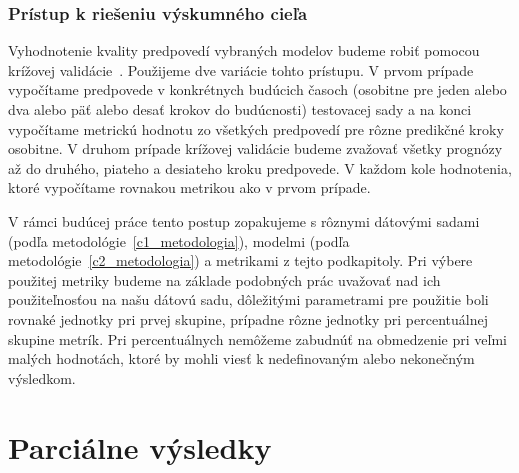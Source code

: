 \documentclass[thesismargins, thesislinespacing, openright, upjsfrontpage, combineabstracts]{rnthesis}
\begin{document}
\subsection{Prístup k riešeniu výskumného cieľa}
 
Vyhodnotenie kvality predpovedí vybraných modelov budeme robiť pomocou krížovej validácie~\cite{hyndman2018forecasting}. Použijeme dve variácie tohto prístupu. V prvom prípade vypočítame predpovede v konkrétnych budúcich časoch (osobitne pre jeden alebo dva alebo päť alebo desať krokov do budúcnosti) testovacej sady a na konci vypočítame metrickú hodnotu zo všetkých predpovedí pre rôzne predikčné kroky osobitne.  V druhom prípade krížovej validácie budeme zvažovať všetky prognózy až do druhého, piateho a desiateho kroku predpovede. V každom kole hodnotenia, ktoré vypočítame rovnakou metrikou ako v prvom prípade.

V rámci budúcej práce tento postup zopakujeme s rôznymi dátovými sadami (podľa metodológie~\ref{c1_metodologia}), modelmi (podľa metodológie~\ref{c2_metodologia}) a metrikami z tejto podkapitoly. Pri výbere použitej metriky budeme na základe podobných prác uvažovať nad ich použiteľnosťou na našu dátovú sadu, dôležitými parametrami pre použitie boli rovnaké jednotky pri prvej skupine, prípadne rôzne jednotky pri percentuálnej skupine metrík. Pri percentuálnych nemôžeme zabudnúť na obmedzenie pri veľmi malých hodnotách, ktoré by mohli viesť k nedefinovaným alebo nekonečným výsledkom.

\chapter{Parciálne výsledky}
\end{document}
